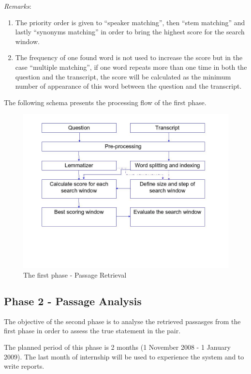 \documentclass[12pt, a4paper]{report}
\begin{document}
\textit{Remarks}:
\begin{enumerate}
\item {The priority order is given to “speaker matching”, then “stem matching” and 
   lastly “synonyms matching” in order to bring the highest score for the search window.}
\item {The frequency of one found word is not used to increase the score but in the 
   case “multiple matching”, if one word repeats more than one time in both the 
   question and the transcript, the score will be calculated as the minimum number 
   of appearance of this word between the question and the transcript.}
\end{enumerate}


The following schema presents the processing flow of the first phase. 

\begin{figure}[htbp]
\centering
\includegraphics[scale = 0.4]{schema1.jpg}
\caption{The first phase - Passage Retrieval}\label{fig1}
\end{figure}
\newpage



\subsection{Phase 2 - Passage Analysis}
The objective of the second phase is to analyse the retrieved passasges from the first phase in order to assess the true statement in the pair.

The planned period of this phase is 2 months (1 November 2008 - 1 January 2009). The last month of internship will be used to experience the system and to write reports.
\end{document}
